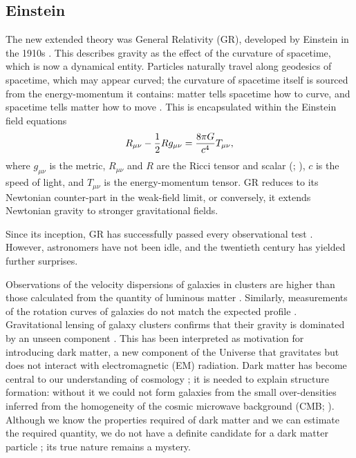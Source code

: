 \subsection{Einstein}

The new extended theory was General Relativity (GR), developed by Einstein in the 1910s \citep{Einstein1997}. This describes gravity as the effect of the curvature of spacetime, which is now a dynamical entity. Particles naturally travel along geodesics of spacetime, which may appear curved; the curvature of spacetime itself is sourced from the energy-momentum it contains: matter tells spacetime how to curve, and spacetime tells matter how to move \citep[section 1.1]{Misner1973}. This is encapsulated within the Einstein field equations \citep[documents 22 and 25]{Einstein1997}
\begin{equation}
R_{\mu\nu} - \frac{1}{2}R g_{\mu\nu} = \frac{8\pi G}{c^4}T_{\mu\nu},
\end{equation}
where $g_{\mu\nu}$ is the metric, $R_{\mu\nu}$ and $R$ are the Ricci tensor and scalar (\citealt[section 8.7]{Misner1973}; \citealt[section 3.2]{Wald1984}), $c$ is the speed of light, and $T_{\mu\nu}$ is the energy-momentum tensor. GR reduces to its Newtonian counter-part in the weak-field limit, or conversely, it extends Newtonian gravity to stronger gravitational fields.

Since its inception, GR has successfully passed every observational test \citep{Will1993, Will2006}. However, astronomers have not been idle, and the twentieth century has yielded further surprises.

Observations of the velocity dispersions of galaxies in clusters are higher than those calculated from the quantity of luminous matter \citep[e.g.,][]{Zwicky1937}. Similarly, measurements of the rotation curves of galaxies do not match the expected profile \citep{Babcock1939}. Gravitational lensing of galaxy clusters confirms that their gravity is dominated by an unseen component \citep{Bergmann1990,Clowe2006}. This has been interpreted as motivation for introducing dark matter, a new component of the Universe that gravitates but does not interact with electromagnetic (EM) radiation. Dark matter has become central to our understanding of cosmology \citep[e.g.,][]{Springel2006a}; it is needed to explain structure formation: without it we could not form galaxies from the small over-densities inferred from the homogeneity of the cosmic microwave background (CMB; \citealt{White1978,Liddle1993}). Although we know the properties required of dark matter and we can estimate the required quantity, we do not have a definite candidate for a dark matter particle \citep{Bertone2005}; its true nature remains a mystery.

